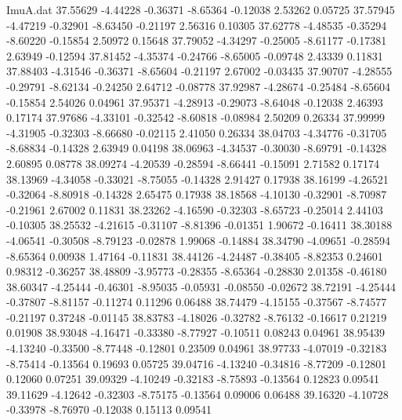 \begin{filecontents}{ImuA.dat}
  37.55629   -4.44228   -0.36371   -8.65364   -0.12038    2.53262    0.05725
  37.57945   -4.47219   -0.32901   -8.63450   -0.21197    2.56316    0.10305
  37.62778   -4.48535   -0.35294   -8.60220   -0.15854    2.50972    0.15648
  37.79052   -4.34297   -0.25005   -8.61177   -0.17381    2.63949   -0.12594
  37.81452   -4.35374   -0.24766   -8.65005   -0.09748    2.43339    0.11831
  37.88403   -4.31546   -0.36371   -8.65604   -0.21197    2.67002   -0.03435
  37.90707   -4.28555   -0.29791   -8.62134   -0.24250    2.64712   -0.08778
  37.92987   -4.28674   -0.25484   -8.65604   -0.15854    2.54026    0.04961
  37.95371   -4.28913   -0.29073   -8.64048   -0.12038    2.46393    0.17174
  37.97686   -4.33101   -0.32542   -8.60818   -0.08984    2.50209    0.26334
  37.99999   -4.31905   -0.32303   -8.66680   -0.02115    2.41050    0.26334
  38.04703   -4.34776   -0.31705   -8.68834   -0.14328    2.63949    0.04198
  38.06963   -4.34537   -0.30030   -8.69791   -0.14328    2.60895    0.08778
  38.09274   -4.20539   -0.28594   -8.66441   -0.15091    2.71582    0.17174
  38.13969   -4.34058   -0.33021   -8.75055   -0.14328    2.91427    0.17938
  38.16199   -4.26521   -0.32064   -8.80918   -0.14328    2.65475    0.17938
  38.18568   -4.10130   -0.32901   -8.70987   -0.21961    2.67002    0.11831
  38.23262   -4.16590   -0.32303   -8.65723   -0.25014    2.44103   -0.10305
  38.25532   -4.21615   -0.31107   -8.81396   -0.01351    1.90672   -0.16411
  38.30188   -4.06541   -0.30508   -8.79123   -0.02878    1.99068   -0.14884
  38.34790   -4.09651   -0.28594   -8.65364    0.00938    1.47164   -0.11831
  38.44126   -4.24487   -0.38405   -8.82353    0.24601    0.98312   -0.36257
  38.48809   -3.95773   -0.28355   -8.65364   -0.28830    2.01358   -0.46180
  38.60347   -4.25444   -0.46301   -8.95035   -0.05931   -0.08550   -0.02672
  38.72191   -4.25444   -0.37807   -8.81157   -0.11274    0.11296    0.06488
  38.74479   -4.15155   -0.37567   -8.74577   -0.21197    0.37248   -0.01145
  38.83783   -4.18026   -0.32782   -8.76132   -0.16617    0.21219    0.01908
  38.93048   -4.16471   -0.33380   -8.77927   -0.10511    0.08243    0.04961
  38.95439   -4.13240   -0.33500   -8.77448   -0.12801    0.23509    0.04961
  38.97733   -4.07019   -0.32183   -8.75414   -0.13564    0.19693    0.05725
  39.04716   -4.13240   -0.34816   -8.77209   -0.12801    0.12060    0.07251
  39.09329   -4.10249   -0.32183   -8.75893   -0.13564    0.12823    0.09541
  39.11629   -4.12642   -0.32303   -8.75175   -0.13564    0.09006    0.06488
  39.16320   -4.10728   -0.33978   -8.76970   -0.12038    0.15113    0.09541

\end{filecontents}
